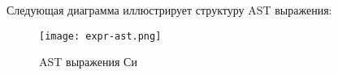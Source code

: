 Следующая диаграмма иллюстрирует структуру AST выражения: 




\begin{figure}[h!]
    \texttt{[image: expr-ast.png]}
    \centering
    \caption{AST выражения Си}
    \label{parsing:expr-ast-diag}
\end{figure}



